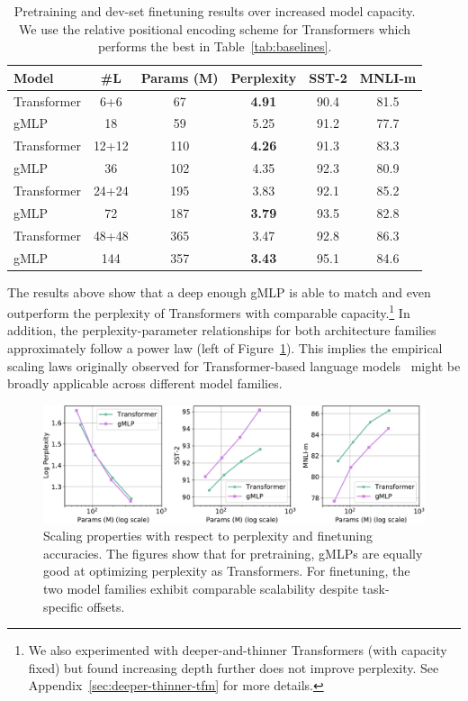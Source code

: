 \documentclass{article}
\newcommand{\gffn}{gMLP\xspace}
\begin{document}
\begin{table}[h]
\centering
\small
\caption{Pretraining and dev-set finetuning results over increased model capacity.
We use the relative positional encoding scheme for Transformers which performs the best in Table~\ref{tab:baselines}.}
\begin{tabular}{@{}l|c|c|c|cc@{}}
\toprule
Model & \#L & Params (M) & Perplexity & SST-2 & MNLI-m \\ \midrule
Transformer & 6+6 & 67 & \textbf{4.91} & 90.4 & 81.5 \\
\gffn  & 18  & 59 & 5.25 & 91.2 & 77.7 \\
\midrule
Transformer  & 12+12  & 110 & \textbf{4.26} & 91.3 & 83.3 \\
\gffn & 36 & 102 & 4.35 & 92.3 & 80.9 \\
\midrule
Transformer  & 24+24 & 195 & 3.83 & 92.1 & 85.2 \\ 
\gffn & 72 & 187 & \textbf{3.79} & 93.5 & 82.8 \\
\midrule
Transformer & 48+48 & 365  & 3.47 & 92.8 & 86.3 \\
\gffn  & 144 & 357 & \textbf{3.43} & 95.1 & 84.6 \\
 \bottomrule
\end{tabular}
\label{tab:depth-scaling}
\vspace{-0.2cm}
\end{table}

The results above show that a deep enough \gffn
is able to match and even outperform the perplexity of Transformers with comparable capacity.\footnote{We also experimented with deeper-and-thinner Transformers (with capacity fixed) but found increasing depth further does not improve perplexity. See Appendix~\ref{sec:deeper-thinner-tfm} for more details.}
In addition,
the perplexity-parameter relationships for both architecture families approximately follow a power law (left of Figure~\ref{fig:scaling}).
This implies the empirical scaling laws originally observed for Transformer-based language models~\cite{kaplan2020scaling} might be broadly applicable across different model families.

\begin{figure}[h]
    \centering
    \includegraphics[width=0.9\linewidth]{figures/scaling.pdf}
    \caption{Scaling properties with respect to perplexity and finetuning accuracies. The figures show that for pretraining, \gffn{s} are equally good at optimizing perplexity as Transformers. For finetuning, the two model families exhibit comparable scalability despite task-specific offsets.}
    \label{fig:scaling}
\end{figure}
\end{document}
